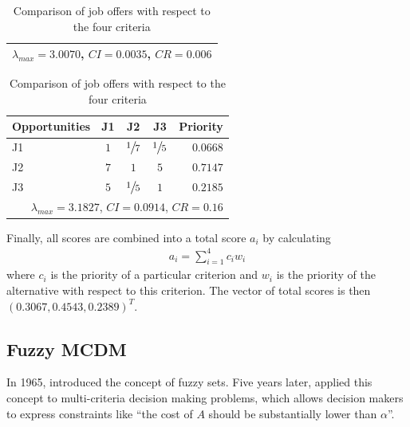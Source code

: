\begin{table}[h]
\begin{tabular}{lcccr}
        \hline
        \multicolumn{5}{r}{$\lambda_{max} = 3.0070$, $CI = 0.0035$, $CR = 0.006$}   \\
        \hline
    \end{tabular}
    \hfill
    \begin{tabular}{lcccr}
        \hline
        \textbf{Opportunities} & J1  & J2              & J3              & Priority \\
        \hline
        J1                     & $1$ & ${\large \sfrac{1}{7}}$ & ${\large \sfrac{1}{5}}$ & $0.0668$ \\
        J2                     & $7$ & $1$             & $5$             & $0.7147$ \\
        J3                     & $5$ & ${\large \sfrac{1}{5}}$ & $1$             & $0.2185$ \\        
        \hline
        \multicolumn{5}{r}{$\lambda_{max} = 3.1827$, $CI = 0.0914$, $CR = 0.16$}    \\
        \hline
    \end{tabular}
    \caption{Comparison of job offers with respect to the four criteria}
    \label{tab:ahp-alternatives}
\end{table}

Finally, all scores are combined into a total score $a_i$ by calculating
\begin{gather*}
    a_i = \sum_{i = 1}^{4} c_i w_i
\end{gather*}
where $c_i$ is the priority of a particular criterion and $w_i$ is the priority of the alternative with respect to this criterion. The vector of total scores is then $(0.3067, 0.4543, 0.2389)^T$.

\subsection{Fuzzy MCDM}
\label{sec:fuzzy}

In 1965, \citet{Zadeh:1965} introduced the concept of fuzzy sets. Five years later, \citet{Bellman:1970} applied this concept to multi-criteria decision making problems, which allows decision makers to express constraints like ``the cost of $A$ should be substantially lower than $\alpha$''.

